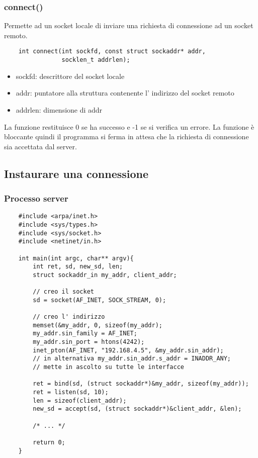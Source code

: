 \subsubsection{connect()}
Permette ad un socket locale di inviare una richiesta di connessione ad un socket remoto.
\begin{verbatim}
    int connect(int sockfd, const struct sockaddr* addr,
                socklen_t addrlen);
\end{verbatim}
\begin{itemize}
    \item sockfd: descrittore del socket locale
    \item addr: puntatore alla struttura contenente l' indirizzo del socket remoto
    \item addrlen: dimensione di addr
\end{itemize}
La funzione restituisce 0 se ha successo e -1 se si verifica un errore.
La funzione è bloccante quindi il programma si ferma in attesa che la richiesta di connessione sia accettata dal server.

\subsection{Instaurare una connessione}
\subsubsection{Processo server}
\begin{verbatim}
    #include <arpa/inet.h>
    #include <sys/types.h>
    #include <sys/socket.h>
    #include <netinet/in.h>
    
    int main(int argc, char** argv){
        int ret, sd, new_sd, len;
        struct sockaddr_in my_addr, client_addr;

        // creo il socket
        sd = socket(AF_INET, SOCK_STREAM, 0);
        
        // creo l' indirizzo
        memset(&my_addr, 0, sizeof(my_addr);
        my_addr.sin_family = AF_INET;
        my_addr.sin_port = htons(4242);
        inet_pton(AF_INET, "192.168.4.5", &my_addr.sin_addr);
        // in alternativa my_addr.sin_addr.s_addr = INADDR_ANY;
        // mette in ascolto su tutte le interfacce
        
        ret = bind(sd, (struct sockaddr*)&my_addr, sizeof(my_addr));
        ret = listen(sd, 10);
        len = sizeof(client_addr);
        new_sd = accept(sd, (struct sockaddr*)&client_addr, &len);
    
        /* ... */
    
        return 0;
    }
\end{verbatim}

